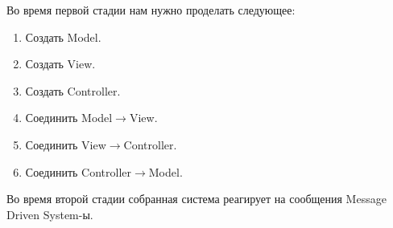 Во время первой стадии нам нужно проделать следующее:
\begin{enumerate}
\item Создать Model.

\item Создать View.

\item Создать Controller.

\item Соединить Model$\to$View.

\item Соединить View$\to$Controller.

\item Соединить Controller$\to$Model.
\end{enumerate}
Во время второй стадии собранная система реагирует на сообщения Message Driven System-ы.


